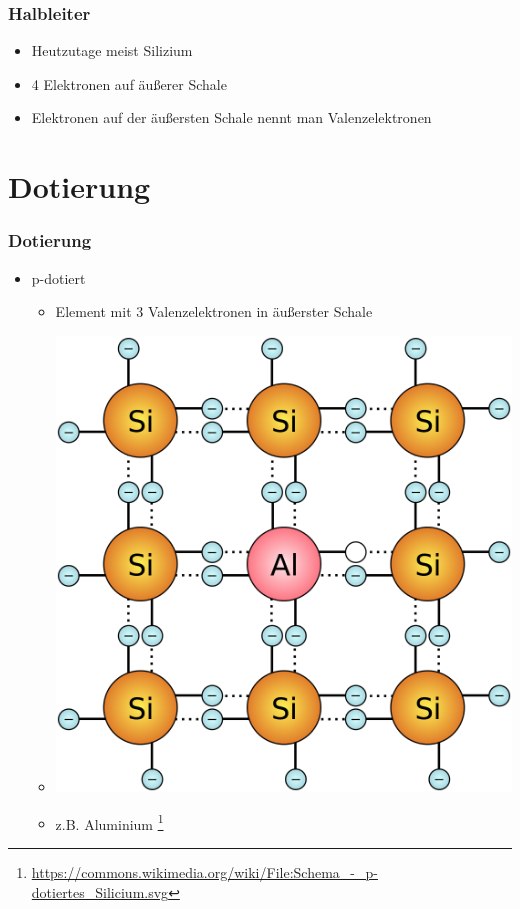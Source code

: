 \begin{frame}
    \frametitle{Halbleiter}
    \begin{center}
    \begin{itemize}
			\item Heutzutage meist Silizium
			\item 4 Elektronen auf äußerer Schale
			\item Elektronen auf der äußersten Schale nennt man Valenzelektronen
    \end{itemize}
	\end{center}
\end{frame}

\section*{Dotierung}

\begin{frame}
    \frametitle{Dotierung}
      	\begin{itemize}
			\item p-dotiert
      		\begin{itemize}
				\item Element mit 3 Valenzelektronen in äußerster Schale
				\item \includegraphics[width=.65\textwidth]{e12/p-dot.png}
				\item z.B. Aluminium
        \footnote{\tiny \url{https://commons.wikimedia.org/wiki/File:Schema_-_p-dotiertes_Silicium.svg}}
    	\end{itemize}
    \end{itemize}
\end{frame}

